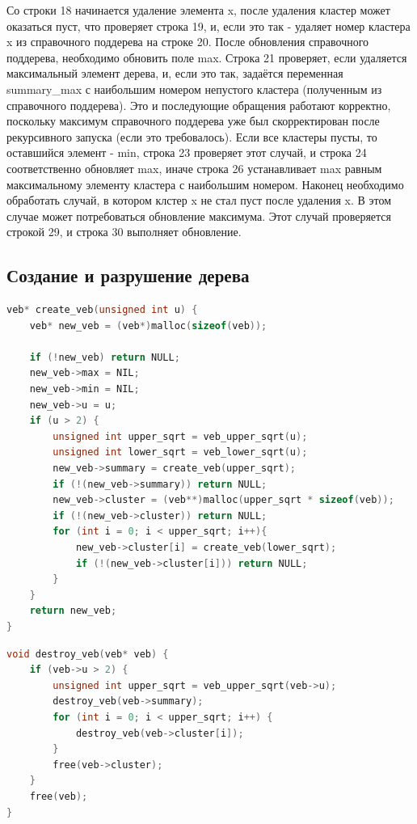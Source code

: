 \documentclass{article}
\begin{document}
Со строки 18 начинается удаление элемента x, после удаления кластер может оказаться пуст, что проверяет строка 19, и, если это так - удаляет номер кластера x из справочного поддерева на строке 20. После обновления справочного поддерева, необходимо обновить поле max. Строка 21 проверяет, если удаляется максимальный элемент дерева, и, если это так, задаётся переменная summary\_max с наибольшим номером непустого кластера (полученным из справочного поддерева). Это и последующие обращения работают корректно, поскольку максимум справочного поддерева уже был скорректирован после рекурсивного запуска (если это требовалось). Если все кластеры пусты, то оставшийся элемент - min, строка 23 проверяет этот случай, и строка 24 соответственно обновляет max, иначе строка 26 устанавливает max равным максимальному элементу кластера с наибольшим номером.
Наконец необходимо обработать случай, в котором клстер x не стал пуст после удаления x. В этом случае может потребоваться обновление максимума. Этот случай проверяется строкой 29, и строка 30 выполняет обновление.




\subsection{Создание и разрушение дерева}
\begin{lstlisting}[language=C,style=C]
veb* create_veb(unsigned int u) {
    veb* new_veb = (veb*)malloc(sizeof(veb));
    
    if (!new_veb) return NULL;
    new_veb->max = NIL;
    new_veb->min = NIL;
    new_veb->u = u;
    if (u > 2) {
        unsigned int upper_sqrt = veb_upper_sqrt(u);
        unsigned int lower_sqrt = veb_lower_sqrt(u);
        new_veb->summary = create_veb(upper_sqrt);
        if (!(new_veb->summary)) return NULL;
        new_veb->cluster = (veb**)malloc(upper_sqrt * sizeof(veb));
        if (!(new_veb->cluster)) return NULL;
        for (int i = 0; i < upper_sqrt; i++){
            new_veb->cluster[i] = create_veb(lower_sqrt);
            if (!(new_veb->cluster[i])) return NULL;
        }
    }
    return new_veb;
}
\end{lstlisting}
\begin{lstlisting}[language=C,style=C]
void destroy_veb(veb* veb) {
    if (veb->u > 2) {
        unsigned int upper_sqrt = veb_upper_sqrt(veb->u);
        destroy_veb(veb->summary);
        for (int i = 0; i < upper_sqrt; i++) {
            destroy_veb(veb->cluster[i]);
        }
        free(veb->cluster);
    }
    free(veb);
}
\end{lstlisting}
\end{document}
